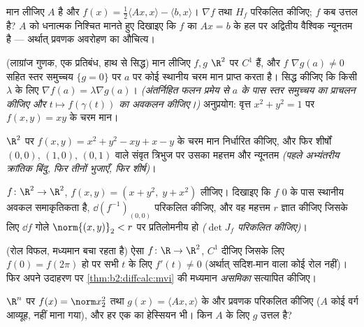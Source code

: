 \begin{exercise}[$\star\star$]\label{exo:b2:diffcalc:5}
मान लीजिए $A$  है और $f(x) = \frac12\langle Ax, x\rangle -
\langle b, x\rangle$। $\nabla f$ तथा $H_f$ परिकलित कीजिए; $f$ कब उत्तल
है? $A$ को धनात्मक निश्चित मानते हुए दिखाइए कि $f$ का $Ax = b$ के हल पर
अद्वितीय वैश्विक न्यूनतम है --- अर्थात् प्रवणक अवरोहण का औचित्य।
\end{exercise}

\begin{exercise}[$\star\star$]\label{exo:b2:diffcalc:6}
(लाग्रांज गुणक, एक प्रतिबंध, हाथ से सिद्ध) मान लीजिए $f, g$ $\R^2$ पर $C^1$ हैं,
और $f$ $\nabla g(a) \neq 0$ सहित स्तर समुच्चय $\{g = 0\}$ पर $a$ पर कोई स्थानीय चरम मान प्राप्त
करता है। सिद्ध कीजिए कि किसी $\lambda$ के लिए $\nabla f(a) = \lambda\nabla g(a)$। \emph{(अंतर्निहित फलन प्रमेय
से $a$ के पास स्तर समुच्चय का प्राचलन कीजिए और $t \mapsto f(\gamma(t))$ का अवकलन कीजिए।)}
अनुप्रयोग: वृत्त $x^2 + y^2 = 1$ पर $f(x,y) = xy$ के चरम मान।
\end{exercise}

\begin{exercise}[$\star\star$]\label{exo:b2:diffcalc:7}
$\R^2$ पर $f(x, y) = x^2 + y^2 - xy + x - y$ के चरम मान निर्धारित कीजिए, और फिर शीर्षों $(0,0)$, $(1,0)$, $(0,1)$ वाले
संवृत त्रिभुज पर उसका महत्तम और न्यूनतम \emph{(पहले अभ्यंतरीय क्रांतिक
बिंदु, फिर तीनों भुजाएँ, फिर शीर्ष)}।
\end{exercise}

\begin{exercise}[$\star\star\star$]\label{exo:b2:diffcalc:8}
$f \colon \R^2 \to \R^2$, $f(x, y) = (x + y^2,\; y + x^2)$ लीजिए। दिखाइए कि $f$ $0$ के पास स्थानीय अवकल समाकृतिकता है, $\dd(f^{-1})_{(0,0)}$
परिकलित कीजिए, और वह महत्तम $r$ ज्ञात कीजिए जिसके लिए $\dd f$ गोले $\norm{(x,y)}_2 < r$ पर
प्रतिलोमनीय हो \emph{($\det J_f$ परिकलित कीजिए)}।
\end{exercise}

\begin{exercise}[$\star\star\star$]\label{exo:b2:diffcalc:9}
(रोल विफल, मध्यमान बचा रहता है) ऐसा $f \colon \R \to \R^2$, $C^1$ दीजिए जिसके लिए $f(0) = f(2\pi)$ हो पर
सभी $t$ के लिए $f'(t) \neq 0$ (अर्थात् सदिश-मान वाला कोई रोल नहीं)। फिर अपने उदाहरण
पर \cref{thm:b2:diffcalc:mvi} की मध्यमान \emph{असमिका} सत्यापित कीजिए।
\end{exercise}

\begin{exercise}[$\star$]\label{exo:b2:diffcalc:10}
$\R^n$ पर $f(x) = \norm
x_2^2$ तथा $g(x) = \langle Ax, x\rangle$ के  और प्रवणक परिकलित कीजिए ($A$ कोई वर्ग आव्यूह,
 नहीं माना गया), और हर एक का हेस्सियन भी। किन $A$ के लिए $g$ उत्तल
है?
\end{exercise}

